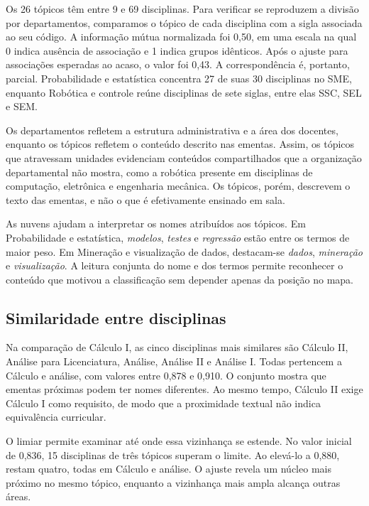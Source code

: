 \documentclass[
  12pt,
  oneside,
  a4paper,
  article,
  brazil
]{USPSC-classe/USPSC}
\begin{document}
Os 26 tópicos têm entre 9 e 69 disciplinas. Para verificar se reproduzem a
divisão por departamentos, comparamos o tópico de cada disciplina com a sigla
associada ao seu código. A informação mútua normalizada foi 0,50, em uma escala
na qual 0 indica ausência de associação e 1 indica grupos idênticos. Após o
ajuste para associações esperadas ao acaso, o valor foi 0,43. A correspondência
é, portanto, parcial. Probabilidade e estatística concentra 27 de suas 30
disciplinas no SME, enquanto Robótica e controle reúne disciplinas de sete
siglas, entre elas SSC, SEL e SEM.

Os departamentos refletem a estrutura
administrativa e a área dos docentes, enquanto os tópicos refletem o conteúdo
descrito nas ementas. Assim, os tópicos que atravessam unidades evidenciam
conteúdos compartilhados que a organização departamental não mostra, como a
robótica presente em disciplinas de computação, eletrônica e engenharia
mecânica. Os tópicos, porém, descrevem o texto das ementas, e não o que é
efetivamente ensinado em sala.

As nuvens ajudam a interpretar os nomes atribuídos aos tópicos. Em
Probabilidade e estatística, \emph{modelos}, \emph{testes} e \emph{regressão}
estão entre os termos de maior peso. Em Mineração e visualização de dados,
destacam-se \emph{dados}, \emph{mineração} e \emph{visualização}. A leitura
conjunta do nome e dos termos permite reconhecer o conteúdo que motivou a
classificação sem depender apenas da posição no mapa.

\subsection{Similaridade entre disciplinas}

Na comparação de Cálculo I, as cinco disciplinas mais similares são Cálculo II,
Análise para Licenciatura, Análise, Análise II e Análise I. Todas pertencem a
Cálculo e análise, com valores entre 0,878 e 0,910. O conjunto mostra que
ementas próximas podem ter nomes diferentes. Ao mesmo tempo, Cálculo II exige
Cálculo I como requisito, de modo que a proximidade textual não indica
equivalência curricular.

O limiar permite examinar até onde essa vizinhança se estende. No valor inicial
de 0,836, 15 disciplinas de três tópicos superam o limite. Ao elevá-lo a 0,880,
restam quatro, todas em Cálculo e análise. O ajuste revela um núcleo mais
próximo no mesmo tópico, enquanto a vizinhança mais ampla alcança outras áreas.
\end{document}
